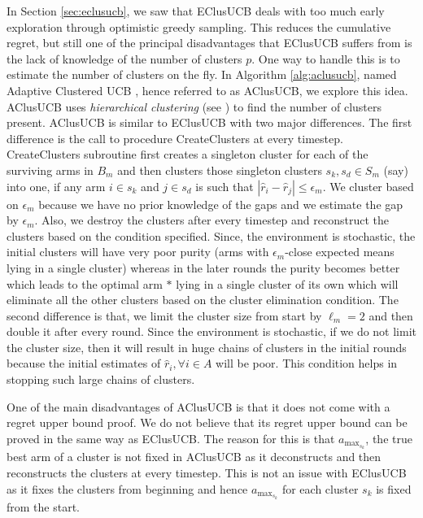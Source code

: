 In Section \ref{sec:eclusucb}, we saw that EClusUCB deals with too much early exploration through optimistic greedy sampling. This reduces the cumulative regret, but still one of the principal disadvantages that EClusUCB suffers from is the lack of knowledge of the number of clusters $p$. One way to handle this is to estimate the number of clusters on the fly. In Algorithm \ref{alg:aclusucb}, named Adaptive Clustered UCB , hence referred to as AClusUCB, we explore this idea. AClusUCB uses \emph{hierarchical clustering} (see \citet{friedman2001elements}) to find the number of clusters present. AClusUCB is similar to EClusUCB with two major differences. The first difference is the call to procedure CreateClusters at every timestep. CreateClusters subroutine first creates a singleton cluster for each of the surviving arms in $B_{m}$ and then clusters those singleton clusters $s_{k}, s_{d}\in S_{m}$ (say) into one, if any arm $i\in s_{k}$ and $j\in s_{d}$ is such that $|\hat{r}_{i}-\hat{r}_{j}|\leq \epsilon_{m}$. We cluster based on $\epsilon_{m}$ because we have no prior knowledge of the gaps and we estimate the gap by $\epsilon_{m}$. Also, we destroy the clusters after every timestep and reconstruct the clusters based on the condition specified. Since, the environment is stochastic, the initial clusters will have very poor purity (arms with $\epsilon_{m}$-close expected means lying in a single cluster) whereas in the later rounds the purity becomes better which leads to the optimal arm $*$ lying in a single cluster of its own which will eliminate all the other clusters based on the cluster elimination condition. The second difference is that, we limit the cluster size from start by $\ell_{m}=2$ and then double it after every round. Since the environment is stochastic, if we do not limit the cluster size, then it will result in huge chains of clusters in the initial rounds because the initial estimates of $\hat{r}_{i},\forall i\in A$ will be poor. This condition helps in stopping such large chains of clusters.  

One of the main disadvantages of AClusUCB is that it does not come with a regret upper bound proof. We do not believe that its regret upper bound can be proved in the same way as EClusUCB. The reason for this is that $a_{\max_{s_{k}}}$, the true best arm of a cluster is not fixed in AClusUCB as it deconstructs and then reconstructs the clusters at every timestep. This is not an issue with EClusUCB as it fixes the clusters from beginning and hence $a_{\max_{s_{k}}}$ for each cluster $s_k$ is fixed from the start.

